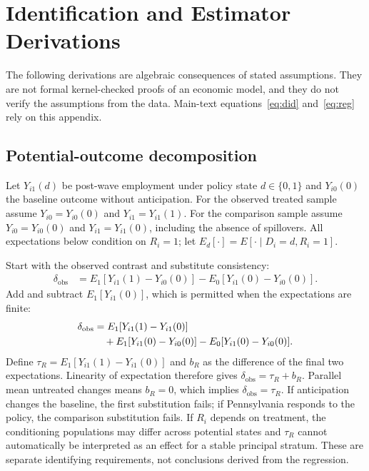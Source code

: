 \documentclass[11pt]{article}
\begin{document}
\appendix
\section{Identification and Estimator Derivations}\label{app:derivation}
The following derivations are algebraic consequences of stated assumptions. They are not formal kernel-checked proofs of an economic model, and they do not verify the assumptions from the data. Main-text equations~\eqref{eq:did} and~\eqref{eq:reg} rely on this appendix. %

\subsection{Potential-outcome decomposition}
Let $Y_{i1}(d)$ be post-wave employment under policy state $d\in\{0,1\}$ and $Y_{i0}(0)$ the baseline outcome without anticipation. For the observed treated sample assume $Y_{i0}=Y_{i0}(0)$ and $Y_{i1}=Y_{i1}(1)$. For the comparison sample assume $Y_{i0}=Y_{i0}(0)$ and $Y_{i1}=Y_{i1}(0)$, including the absence of spillovers. All expectations below condition on $R_i=1$; let $E_d[\cdot]=E[\cdot\mid D_i=d,R_i=1]$. %

Start with the observed contrast and substitute consistency:
\begin{align}
\delta_{\mathrm{obs}}
 &=E_1[Y_{i1}(1)-Y_{i0}(0)]
   -E_0[Y_{i1}(0)-Y_{i0}(0)].\label{eq:stepone}
\end{align}
Add and subtract $E_1[Y_{i1}(0)]$, which is permitted when the expectations are finite:
\begin{align}
\delta_{\mathrm{obs}}
 &=E_1[Y_{i1}(1)-Y_{i1}(0)]\notag\\
 &\quad+E_1[Y_{i1}(0)-Y_{i0}(0)]
       -E_0[Y_{i1}(0)-Y_{i0}(0)].\label{eq:steptwo}
\end{align}
Define $\tau_R=E_1[Y_{i1}(1)-Y_{i1}(0)]$ and $b_R$ as the difference of the final two expectations. Linearity of expectation therefore gives $\delta_{\mathrm{obs}}=\tau_R+b_R$. Parallel mean untreated changes means $b_R=0$, which implies $\delta_{\mathrm{obs}}=\tau_R$. If anticipation changes the baseline, the first substitution fails; if Pennsylvania responds to the policy, the comparison substitution fails. If $R_i$ depends on treatment, the conditioning populations may differ across potential states and $\tau_R$ cannot automatically be interpreted as an effect for a stable principal stratum. These are separate identifying requirements, not conclusions derived from the regression. %
\end{document}
